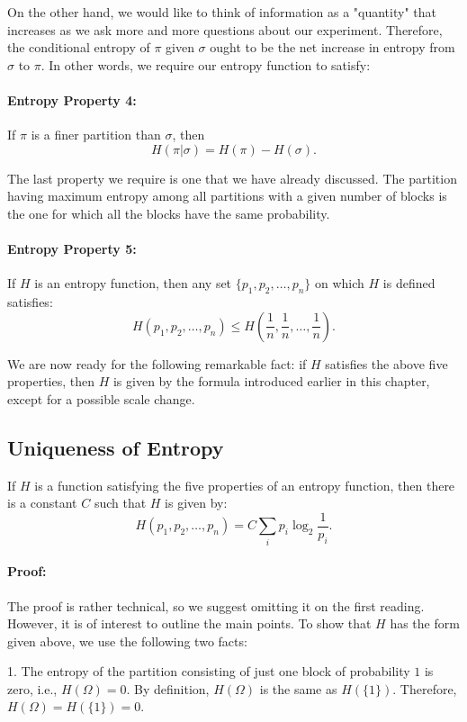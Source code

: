 \documentclass{report}
\begin{document}
On the other hand, we would like to think of information as a "quantity" that increases as we ask more and more questions about our experiment. Therefore, the conditional entropy of \( \pi \) given \( \sigma \) ought to be the net increase in entropy from \( \sigma \) to \( \pi \). In other words, we require our entropy function to satisfy:

\paragraph{Entropy Property 4:} 
If \( \pi \) is a finer partition than \( \sigma \), then
\[
H(\pi|\sigma) = H(\pi) - H(\sigma).
\]

The last property we require is one that we have already discussed. The partition having maximum entropy among all partitions with a given number of blocks is the one for which all the blocks have the same probability.

\paragraph{Entropy Property 5:} 
If \( H \) is an entropy function, then any set \( \{p_1, p_2, \ldots, p_n\} \) on which \( H \) is defined satisfies:
\[
H(p_1, p_2, \ldots, p_n) \leq H\left(\frac{1}{n}, \frac{1}{n}, \ldots, \frac{1}{n}\right).
\]

We are now ready for the following remarkable fact: if \( H \) satisfies the above five properties, then \( H \) is given by the formula introduced earlier in this chapter, except for a possible scale change.

\subsection*{Uniqueness of Entropy}
If \( H \) is a function satisfying the five properties of an entropy function, then there is a constant \( C \) such that \( H \) is given by:
\[
H(p_1, p_2, \ldots, p_n) = C \sum_{i} p_i \log_2 \frac{1}{p_i}.
\]

\paragraph{Proof:} 
The proof is rather technical, so we suggest omitting it on the first reading. However, it is of interest to outline the main points. To show that \( H \) has the form given above, we use the following two facts:

1. The entropy of the partition consisting of just one block of probability \( 1 \) is zero, i.e., \( H(\Omega) = 0 \). By definition, \( H(\Omega) \) is the same as \( H(\{1\}) \). Therefore, \( H(\Omega) = H(\{1\}) = 0 \).
\end{document}

